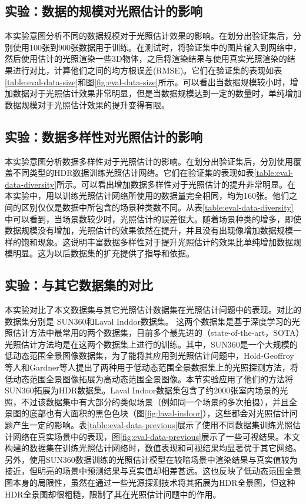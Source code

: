 \subsection{实验：数据的规模对光照估计的影响}

本实验意图分析不同的数据规模对于光照估计效果的影响。在划分出验证集后，分别使用100张到900张数据用于训练。在测试时，将验证集中的图片输入到网络中，然后使用估计的光照渲染一些3D物体，之后将渲染结果与使用真实光照渲染的结果进行对比，计算他们之间的均方根误差(RMSE)。它们在验证集的表现如表\ref{table:eval-data-size}和图\ref{fig:eval-data-size}所示。可以看出当数据规模较小时，增加数据对于光照估计效果非常明显，但是当数据规模达到一定的数量时，单纯增加数据规模对于光照估计效果的提升变得有限。

\subsection{实验：数据多样性对光照估计的影响}

本实验意图分析数据多样性对于光照估计的影响。在划分出验证集后，分别使用覆盖不同类型的HDR数据训练光照估计网络。它们在验证集的表现如表\ref{table:eval-data-diversity}所示。可以看出增加数据多样性对于光照估计的提升非常明显。在本实验中，用以训练光照估计网络所使用的数据量完全相同，均为160张。他们之间的区别仅仅是数据中所包含的场景种类数不同。从表\ref{table:eval-data-diversity}中可以看到，当场景数较少时，光照估计的误差很大。随着场景种类的增多，即使数据规模没有增加，光照估计的效果依然在提升，并且没有出现像增加数据规模一样的饱和现象。这说明丰富数据多样性对于提升光照估计的效果比单纯增加数据规模明显。这为以后数据集的扩充提供了指导和依据。
\subsection{实验：与其它数据集的对比}

本实验对比了本文数据集与其它光照估计数据集在光照估计问题中的表现。对比的数据集分别是
SUN360\cite{xiao2012recognizing}和Laval Inddor\cite{gardner2017learning}数据集。
这两个数据集是基于深度学习的光照估计方法中最常用的两个数据集，目前多个最先进的（state-of-the-art，SOTA）光照估计方法均是在这两个数据集上进行的训练。其中，SUN360是一个大规模的低动态范围全景图像数据集，为了能将其应用到光照估计问题中，Hold-Geoffroy等人\cite{hold2017deep}和Gardner等人\cite{gardner2017learning}提出了两种用于低动态范围全景数据集上的光照探测方法，将低动态范围全景图像拓展为高动态范围全景图像。本节实验应用了他们的方法将SUN360拓展为HDR数据集。Laval Indoor数据集包含了约2000张室内场景的光照，不过该数据集中有大部分的类似场景（例如同一个场景的多次拍摄），并且全景图的底部也有大面积的黑色色块（图\ref{fig:laval-indoor}），这些都会对光照估计问题产生一定的影响。表\ref{table:eval-data-previous}展示了使用不同数据集训练光照估计网络在真实场景中的表现，图\ref{fig:eval-data-previous}展示了一些可视结果。本文构建的数据集在训练光照估计网络时，数值表现和可视结果均显著优于其它网络。另外，使用SUN360数据训练的光照估计模型在较暗场景中渲染结果与真实值较为接近，但明亮的场景中预测结果与真实值却相差甚远。这也反映了低动态范围全景图本身的局限性，虽然在通过一些光源探测技术将其拓展为HDR全景图，但这种HDR全景图却很粗糙，限制了其在光照估计问题中的作用。

